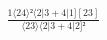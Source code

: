 \documentclass[varwidth, border=5pt]{standalone}
\begin{document}
\begin{my}
$\begin{gathered}
\scriptscriptstyle\frac{1⟨24⟩²⟨2|3+4|1][23]}{⟨23⟩⟨2|3+4|2]²}
\end{gathered}$
\end{my}
\end{document}
